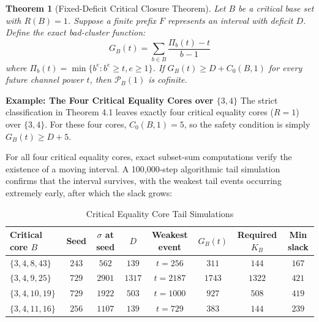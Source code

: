 \documentclass[12pt,reqno]{amsart}
\newtheorem{theorem}{Theorem}[section]
\theoremstyle{definition}
\begin{document}
\begin{theorem}[Fixed-Deficit Critical Closure Theorem]
Let $B$ be a critical base set with $R(B)=1$. Suppose a finite prefix $F$ represents an interval with deficit $D$. Define the exact bad-cluster function:
\[ G_B(t) = \sum_{b \in B} \frac{\Pi_b(t) - t}{b-1} \]
where $\Pi_b(t) = \min \{b^e : b^e \ge t, e \ge 1\}$. If $G_B(t) \ge D + C_0(B,1)$ for every future channel power $t$, then $\mathcal{P}_B(1)$ is cofinite.
\end{theorem}

\textbf{Example: The Four Critical Equality Cores over $\{3,4\}$}
The strict classification in Theorem 4.1 leaves exactly four critical equality cores ($R=1$) over $\{3,4\}$. For these four cores, $C_0(B,1) = 5$, so the safety condition is simply $G_B(t) \ge D + 5$.

For all four critical equality cores, exact subset-sum computations verify the existence of a moving interval. A 100,000-step algorithmic tail simulation confirms that the interval survives, with the weakest tail events occurring extremely early, after which the slack grows:

\begin{table}[h]
\centering
\begin{tabular}{|l|c|c|c|c|c|c|c|}
\hline
\textbf{Critical core $B$} & \textbf{Seed} & \textbf{$\sigma$ at seed} & \textbf{$D$} & \textbf{Weakest event} & \textbf{$G_B(t)$} & \textbf{Required $K_B$} & \textbf{Min slack} \\
\hline
$\{3,4,8,43\}$ & $243$ & $562$ & $139$ & $t=256$ & $311$ & $144$ & $167$ \\
$\{3,4,9,25\}$ & $729$ & $2901$ & $1317$ & $t=2187$ & $1743$ & $1322$ & $421$ \\
$\{3,4,10,19\}$ & $729$ & $1922$ & $503$ & $t=1000$ & $927$ & $508$ & $419$ \\
$\{3,4,11,16\}$ & $256$ & $1107$ & $139$ & $t=729$ & $383$ & $144$ & $239$ \\
\hline
\end{tabular}
\caption{Critical Equality Core Tail Simulations}
\end{table}
\end{document}
